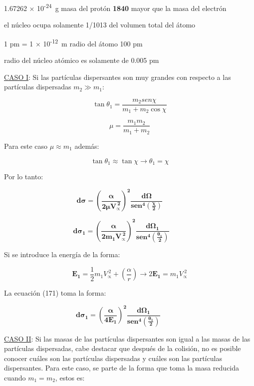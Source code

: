 \documentclass[]{article}
\begin{document}
1.67262 × 10\textsuperscript{-24}~g masa del protón \textbf{1840} mayor
que la masa del electrón

el núcleo ocupa solamente 1/1013 del volumen total del átomo

1 pm = 1 × 10\textsuperscript{-12}~m radio del átomo 100 pm

radio del núcleo atómico es solamente de 0.005 pm

\uline{CASO I}: Si las partículas dispersantes son muy grandes con
respecto a las partículas dispersadas \(m_{2} \gg m_{1}\):

\[\tan{\theta_{1} = \frac{m_{2}{sen}\chi}{m_{1} + m_{2}\cos\chi}}\]

\[\mu = \frac{m_{1}m_{2}}{m_{1} + m_{2}}\]

Para este caso \(\mu \approx m_{1}\) además:

\[\tan\theta_{1} \approx \tan\chi \rightarrow \theta_{1} = \chi\]

Por lo tanto:

\[\mathbf{d\sigma =}\left( \frac{\mathbf{\alpha}}{\mathbf{2}\mathbf{\mu}\mathbf{V}_{\mathbf{\propto}}^{\mathbf{\ 2}}} \right)^{\mathbf{2}}\frac{\mathbf{d}\mathbf{\Omega}}{\mathbf{sen}^{\mathbf{4}}\left( \frac{\mathbf{\chi}}{\mathbf{2}} \right)}\mathbf{\ \ \ \ \ \ \ \ \ \ \ \ \ }\]

\[\mathbf{d}\mathbf{\sigma}_{\mathbf{1}}\mathbf{=}\left( \frac{\mathbf{\alpha}}{\mathbf{2}\mathbf{m}_{\mathbf{1}}\mathbf{V}_{\mathbf{\propto}}^{\mathbf{\ 2}}} \right)^{\mathbf{2}}\frac{\mathbf{d}\mathbf{\Omega}_{\mathbf{1}}}{\mathbf{sen}^{\mathbf{4}}\left( \frac{\mathbf{\theta}_{\mathbf{1}}}{\mathbf{2}} \right)}\mathbf{\ \ \ \ \ \ \ \ \ \ \ }\]

Si se introduce la energía de la forma:

\[\mathbf{E}_{\mathbf{1}} = \frac{1}{2}m_{1}V_{\propto}^{\ 2} + \left( \frac{\alpha}{r} \right) \rightarrow 2\mathbf{E}_{\mathbf{1}} = m_{1}V_{\propto}^{\ 2}\]

La ecuación (171) toma la forma:

\[\mathbf{d}\mathbf{\sigma}_{\mathbf{1}}\mathbf{=}\left( \frac{\mathbf{\alpha}}{\mathbf{4}\mathbf{E}_{\mathbf{1}}} \right)^{\mathbf{2}}\frac{\mathbf{d}\mathbf{\Omega}_{\mathbf{1}}}{\mathbf{sen}^{\mathbf{4}}\left( \frac{\mathbf{\theta}_{\mathbf{1}}}{\mathbf{2}} \right)}\mathbf{\ \ \ \ \ \ \ \ \ \ \ \ \ \ \ }\]

\uline{CASO II}: Si las masas de las partículas dispersantes son igual a
las masas de las partículas dispersadas, cabe destacar que después de la
colisión, no es posible conocer cuáles son las partículas dispersadas y
cuáles son las partículas dispersantes. Para este caso, se parte de la
forma que toma la masa reducida cuando \(m_{1} = m_{2}\), estos es:
\end{document}
